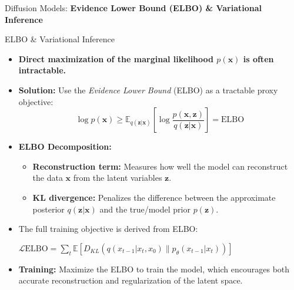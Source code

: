 \begin{frame}{}
    \LARGE Diffusion Models: \textbf{Evidence Lower Bound (ELBO) \& Variational Inference}
\end{frame}

\begin{frame}{ELBO \& Variational Inference}
    \begin{itemize}
        \item \textbf{Direct maximization of the marginal likelihood $p(\mathbf{x})$ is often intractable.}
        \item<2-> \textbf{Solution:} Use the \textit{Evidence Lower Bound} (ELBO) as a tractable proxy objective:
        \begin{equation*}
            \log p(\mathbf{x}) \geq \mathbb{E}_{q(\mathbf{z}|\mathbf{x})} \left[ \log \frac{p(\mathbf{x}, \mathbf{z})}{q(\mathbf{z}|\mathbf{x})} \right] = \text{ELBO}
        \end{equation*}
        \item<3-> \textbf{ELBO Decomposition:}
        \begin{itemize}
            \item \textbf{Reconstruction term:} Measures how well the model can reconstruct the data $\mathbf{x}$ from the latent variables $\mathbf{z}$.
            \item \textbf{KL divergence:} Penalizes the difference between the approximate posterior $q(\mathbf{z}|\mathbf{x})$ and the true/model prior $p(\mathbf{z})$.
        \end{itemize}
        \item<4-> The full training objective is derived from ELBO:

        $\mathcal{L}\text{ELBO} = \sum_t \mathbb{E}[D_{KL}(q(x_{t-1}|x_t, x_0) \| p_\theta(x_{t-1}|x_t))]$

        \item<5-> \textbf{Training:} Maximize the ELBO to train the model, which encourages both accurate reconstruction and regularization of the latent space.
    \end{itemize}
\end{frame}